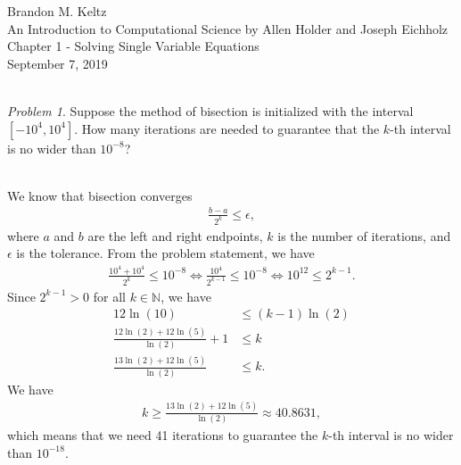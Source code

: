 \documentclass{article}
\begin{document}
	
	\begin{flushleft}	
	
		Brandon M. Keltz\\
		An Introduction to Computational Science by Allen Holder and Joseph Eichholz\\
		Chapter 1 - Solving Single Variable Equations\\
		September 7, 2019\\\
		
		\textit{Problem 1}. Suppose the method of bisection is initialized with the interval $\left[-10^4, 10^4 \right]$. How many iterations are needed to guarantee that the $k$-th interval is no wider than $10^{-8}$?\\\
		
		We know that bisection converges
		\begin{align*}
			\frac{b - a}{2^k} \leq \epsilon,
		\end{align*}
		where $a$ and $b$ are the left and right endpoints, $k$ is the number of iterations, and $\epsilon$ is the tolerance. From the problem statement, we have
		\begin{align*}
			\frac{10^4 + 10^4}{2^k} \leq 10^{-8} \iff \frac{10^4}{2^{k - 1}} \leq 10^{-8} \iff 10^{12} \leq 2^{k - 1}.
		\end{align*}
		Since $2^{k - 1} > 0$ for all $k \in \mathbb{N}$, we have
		\begin{align*}
			12 \ln \left( 10 \right) & \leq \left( k - 1 \right) \ln \left( 2 \right) \\
			\frac{12 \ln \left( 2 \right) + 12 \ln \left( 5 \right)}{\ln \left( 2 \right)} + 1 & \leq k \\
			\frac{13 \ln \left( 2 \right) + 12 \ln \left( 5 \right)}{\ln \left( 2 \right)} & \leq k.
		\end{align*}
		We have
		\begin{align*}
			k \geq \frac{13 \ln \left( 2 \right) + 12 \ln \left( 5 \right)}{\ln \left( 2 \right)} \approx 40.8631,
		\end{align*}
		which means that we need 41 iterations to guarantee the $k$-th interval is no wider than $10^{-18}$.
	
	\end{flushleft}
	
\end{document}
